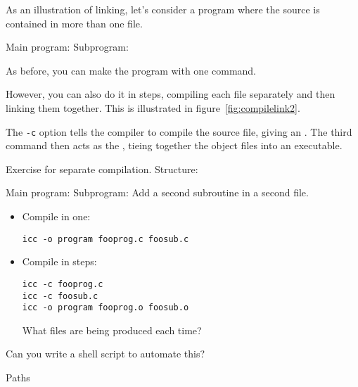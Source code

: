As an illustration of linking,
let's consider a program where the source is contained in more than one file.

\begin{multicols}{2}
  Main program: 
  \columnbreak
  Subprogram: 
\end{multicols}

As before, you can make the program with one command.


However, you can also do it in steps, compiling each file separately
and then linking them together.
This is illustrated in figure~\ref{fig:compilelink2}.


The \texttt{-c} option tells the compiler to compile the source file,
giving an . The third command then acts as the
, tieing together the object files into an
executable.


\begin{exercise}
  \label{ex:compile3}

  Exercise for separate compilation. Structure:
\begin{multicols}{2}
  Main program: 
  \columnbreak
  Subprogram: 
  Add a second subroutine in a second file.
\end{multicols}

  \begin{itemize}
  \item Compile in one:
\begin{verbatim}
icc -o program fooprog.c foosub.c
\end{verbatim}
\item Compile in steps:
\begin{verbatim}
icc -c fooprog.c
icc -c foosub.c
icc -o program fooprog.o foosub.o
\end{verbatim}
What files are being produced each time?
  \end{itemize}
Can you write a shell script to automate this?
\end{exercise}

 {Paths}

